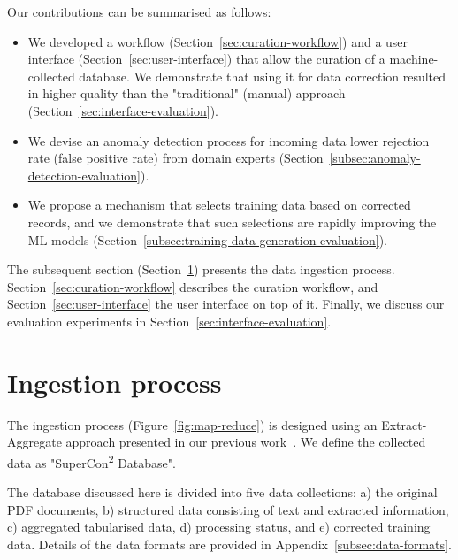 \documentclass[]{interact}
\theoremstyle{plain} %
\theoremstyle{definition}
\theoremstyle{remark}
\begin{document}
Our contributions can be summarised as follows:
\begin{itemize}
    \item We developed a workflow (Section~\ref{sec:curation-workflow}) and a user interface (Section~\ref{sec:user-interface}) that allow the curation of a machine-collected database. We demonstrate that using it for data correction resulted in higher quality than the "traditional" (manual) approach (Section~\ref{sec:interface-evaluation}).
    \item We devise an anomaly detection process for incoming data lower rejection rate (false positive rate) from domain experts (Section~\ref{subsec:anomaly-detection-evaluation}).
    \item We propose a mechanism that selects training data based on corrected records, and we demonstrate that such selections are rapidly improving the ML models (Section~\ref{subsec:training-data-generation-evaluation}).
\end{itemize}

The subsequent section (Section~\ref{sec:ingestion}) presents the data ingestion process.
Section~\ref{sec:curation-workflow} describes the curation workflow, and Section~\ref{sec:user-interface} the user interface on top of it.
Finally, we discuss our evaluation experiments in Section~\ref{sec:interface-evaluation}. 


\section{Ingestion process}
\label{sec:ingestion}

The ingestion process (Figure~\ref{fig:map-reduce}) is designed using an Extract-Aggregate approach presented in our previous work~\cite{lfoppiano2023automatic}. 
We define the collected data as "SuperCon\textsuperscript{2} Database".

The database discussed here is divided into five data collections: a) the original PDF documents, b) structured data consisting of text and extracted information, c) aggregated tabularised data, d) processing status, and e) corrected training data. 
Details of the data formats are provided in Appendix~\ref{subsec:data-formats}.
\end{document}
